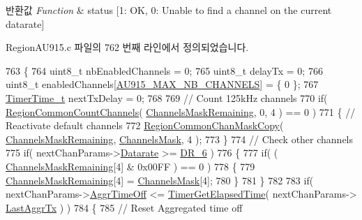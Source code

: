 \begin{DoxyRetVals}{반환값}
{\em Function} & status \mbox{[}1\+: OK, 0\+: Unable to find a channel on the current datarate\mbox{]} \\
\hline
\end{DoxyRetVals}


Region\+A\+U915.\+c 파일의 762 번째 라인에서 정의되었습니다.


\begin{DoxyCode}
763 \{
764     uint8\_t nbEnabledChannels = 0;
765     uint8\_t delayTx = 0;
766     uint8\_t enabledChannels[\mbox{\hyperlink{group___r_e_g_i_o_n_a_u915_ga2b76c47d2463a72cc6c69a6384a6de11}{AU915\_MAX\_NB\_CHANNELS}}] = \{ 0 \};
767     \mbox{\hyperlink{utilities_8h_a4215ca43d3e953099ea758ce428599d0}{TimerTime\_t}} nextTxDelay = 0;
768 
769     \textcolor{comment}{// Count 125kHz channels}
770     \textcolor{keywordflow}{if}( \mbox{\hyperlink{group___r_e_g_i_o_n_c_o_m_m_o_n_gac23f0831812f610f57f42f6cf87368c9}{RegionCommonCountChannels}}( 
      \mbox{\hyperlink{_region_a_u915_8c_a567333cec639a004655cc1717e9d0928}{ChannelsMaskRemaining}}, 0, 4 ) == 0 )
771     \{ \textcolor{comment}{// Reactivate default channels}
772         \mbox{\hyperlink{group___r_e_g_i_o_n_c_o_m_m_o_n_ga95f5199d490113269fae7f2e0569e9a0}{RegionCommonChanMaskCopy}}( \mbox{\hyperlink{_region_a_u915_8c_a567333cec639a004655cc1717e9d0928}{ChannelsMaskRemaining}}, 
      \mbox{\hyperlink{_region_a_u915_8c_a2188957b5ca6af8092154d7ccbfa5757}{ChannelsMask}}, 4  );
773     \}
774     \textcolor{comment}{// Check other channels}
775     \textcolor{keywordflow}{if}( nextChanParams->\mbox{\hyperlink{structs_next_chan_params_ae2f6080f3aa0e9485c55513ca56bb24d}{Datarate}} >= \mbox{\hyperlink{group___r_e_g_i_o_n_ga8e2b4c15b7dbb8bda5ed635ca1d262be}{DR\_6}} )
776     \{
777         \textcolor{keywordflow}{if}( ( \mbox{\hyperlink{_region_a_u915_8c_a567333cec639a004655cc1717e9d0928}{ChannelsMaskRemaining}}[4] & 0x00FF ) == 0 )
778         \{
779             \mbox{\hyperlink{_region_a_u915_8c_a567333cec639a004655cc1717e9d0928}{ChannelsMaskRemaining}}[4] = \mbox{\hyperlink{_region_a_u915_8c_a2188957b5ca6af8092154d7ccbfa5757}{ChannelsMask}}[4];
780         \}
781     \}
782 
783     \textcolor{keywordflow}{if}( nextChanParams->\mbox{\hyperlink{structs_next_chan_params_a3609676d2d3b7c00e25615324b35cb26}{AggrTimeOff}} <= \mbox{\hyperlink{time_server_8c_a9ca7e27f3d6474daff63f2e093a2e91e}{TimerGetElapsedTime}}( nextChanParams->
      \mbox{\hyperlink{structs_next_chan_params_a381b728f60b185ecf3313e974c18768b}{LastAggrTx}} ) )
784     \{
785         \textcolor{comment}{// Reset Aggregated time off}

\end{DoxyCode}
